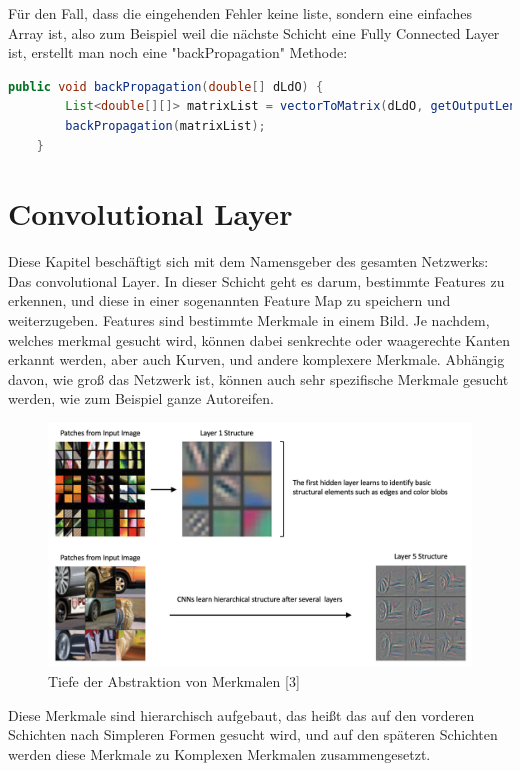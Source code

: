 \documentclass[12pt]{article}
\begin{document}
Für den Fall, dass die eingehenden Fehler keine liste, sondern eine einfaches Array ist, also zum Beispiel weil die nächste Schicht eine Fully Connected Layer ist, erstellt man noch eine "backPropagation" Methode:

\begin{lstlisting}[language=Java]
    public void backPropagation(double[] dLdO) {
        List<double[][]> matrixList = vectorToMatrix(dLdO, getOutputLength(), getOutputRows(), getOutputCols());
        backPropagation(matrixList);
    }
\end{lstlisting}

\cleardoublepage
\section{Convolutional Layer}
Diese Kapitel beschäftigt sich mit dem Namensgeber des gesamten Netzwerks: Das convolutional Layer. 
In dieser Schicht geht es darum, bestimmte Features zu erkennen, und diese in einer sogenannten Feature Map zu speichern und weiterzugeben. Features sind bestimmte Merkmale in einem Bild. Je nachdem, welches merkmal gesucht wird, können dabei senkrechte oder waagerechte Kanten erkannt werden, aber auch Kurven, und andere komplexere Merkmale. Abhängig davon, wie groß das Netzwerk ist, können auch sehr spezifische Merkmale gesucht werden, wie zum Beispiel ganze Autoreifen. 

\begin{figure}[H]
\centering
\includegraphics[scale=0.27]{./Images/BA_003_tensorflow-keras-cnn-hierarchical-structure.png}
\caption{Tiefe der Abstraktion von Merkmalen [3]}
\label{Tiefe der Abstraktion von Merkmalen [3]}
\end{figure}

Diese Merkmale sind hierarchisch aufgebaut, das heißt das auf den vorderen Schichten nach Simpleren Formen gesucht wird, und auf den späteren Schichten werden diese Merkmale zu Komplexen Merkmalen zusammengesetzt.
\end{document}
